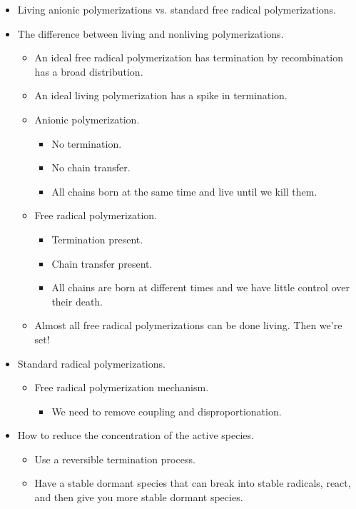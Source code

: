 \documentclass[../notes.tex]{subfiles}
\begin{document}
\begin{itemize}
\begin{itemize}
    \end{itemize}
    \item Living anionic polymerizations vs. standard free radical polymerizations.
    \item The difference between living and nonliving polymerizations.
    \begin{itemize}
        \item An ideal free radical polymerization has termination by recombination has a broad distribution.
        \item An ideal living polymerization has a spike in termination.
        \item Anionic polymerization.
        \begin{itemize}
            \item No termination.
            \item No chain transfer.
            \item All chains born at the same time and live until we kill them.
        \end{itemize}
        \item Free radical polymerization.
        \begin{itemize}
            \item Termination present.
            \item Chain transfer present.
            \item All chains are born at different times and we have little control over their death.
        \end{itemize}
        \item Almost all free radical polymerizations can be done living. Then we're set!
    \end{itemize}
    \item Standard radical polymerizations.
    \begin{itemize}
        \item Free radical polymerization mechanism.
        \begin{itemize}
            \item We need to remove coupling and disproportionation.
        \end{itemize}
    \end{itemize}
    \item How to reduce the concentration of the active species.
    \begin{itemize}
        \item Use a reversible termination process.
        \item Have a stable dormant species that can break into stable radicals, react, and then give you more stable dormant species.

\end{itemize}
\end{itemize}
\end{document}
